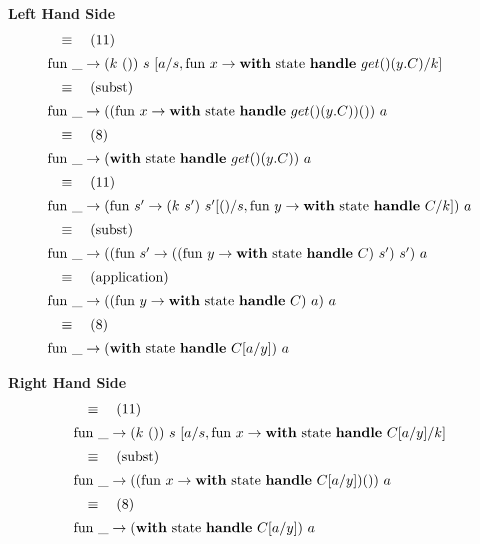 \documentclass[logo,bsc,singlespacing,parskip]{infthesis}
\begin{document}
\textbf{Left Hand Side}
\[ 
\begin{array}{l}
\quad\equiv\quad (11) \\[5pt]
\text{fun }\_ \rightarrow (k\ ())\ s\ [a/s, \text{fun } x \rightarrow \text{\textbf{with} state \textbf{handle} } get() (y. C)/k] \\[5pt]
\quad\equiv\quad (\text{subst}) \\[5pt]
\text{fun }\_ \rightarrow ((\text{fun } x \rightarrow \text{\textbf{with} state \textbf{handle} } get() (y. C)) ())\ a \\[5pt]
\quad\equiv\quad (8) \\[5pt]
\text{fun }\_ \rightarrow (\text{\textbf{with} state \textbf{handle} } get() (y. C))\ a \\[5pt]
\quad\equiv\quad (11) \\[5pt]
\text{fun }\_ \rightarrow (\text{fun } s' \rightarrow  (k\ s')\ s' [()/s, \text{fun } y \rightarrow \text{\textbf{with} state \textbf{handle} } C / k])\ a \\[5pt]
\quad\equiv\quad (\text{subst}) \\[5pt]
\text{fun }\_ \rightarrow ((\text{fun } s' \rightarrow ((\text{fun } y \rightarrow \text{\textbf{with} state \textbf{handle} } C)\ s' )\ s')\ a \\[5pt]
\quad\equiv\quad (\text{application}) \\[5pt]
\text{fun }\_ \rightarrow ((\text{fun } y \rightarrow \text{\textbf{with} state \textbf{handle} } C)\ a )\ a \\[5pt]
\quad\equiv\quad (8) \\[5pt]
\text{fun }\_ \rightarrow (\text{\textbf{with} state \textbf{handle} } C[a/y])\ a
\end{array}
\]

\textbf{Right Hand Side}
\[ 
\begin{array}{l}
\quad\equiv\quad (11) \\[5pt]
\text{fun }\_ \rightarrow (k\ ())\ s\ [a/s, \text{fun } x \rightarrow \text{\textbf{with} state \textbf{handle} } C[a/y]/k] \\[5pt]
\quad\equiv\quad (\text{subst}) \\[5pt]
\text{fun }\_ \rightarrow ((\text{fun } x \rightarrow \text{\textbf{with} state \textbf{handle} } C[a/y]) ())\ a \\[5pt]
\quad\equiv\quad (8) \\[5pt]
\text{fun }\_ \rightarrow (\text{\textbf{with} state \textbf{handle} } C[a/y])\ a
\end{array}
\]
\end{document}
